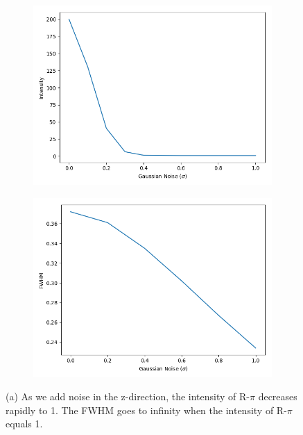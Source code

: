 \documentclass{article}
\begin{document}
  \begin{figure}
  \centering
  \begin{subfigure}{0.45\textwidth}
  \includegraphics[width=\textwidth]{random_layers_z_noise.png}
  \caption{}\label{fig:random_layers_z_noise}
  \end{subfigure}
  \begin{subfigure}{0.45\textwidth}
  \includegraphics[width=\textwidth]{random_layers_xy_noise.png}
  \caption{}\label{fig:random_layers_xy_noise}
  \end{subfigure}
  \caption{(a) As we add noise in the z-direction, the intensity of R-$\pi$ decreases
   rapidly to 1. The FWHM goes to infinity when the intensity of R-$\pi$ equals 1.}\label{fig:layers_noise}
  \end{figure}
\end{document}
